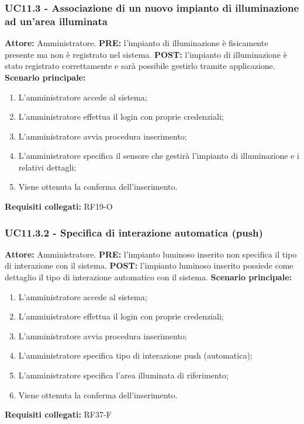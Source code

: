 \documentclass[a4paper, 12pt]{article}
\begin{document}
\subsubsection{UC11.3 - Associazione di un nuovo impianto di illuminazione ad un'area illuminata}
\textbf{Attore:} Amministratore.\newline
\textbf{PRE:} l'impianto di illuminazione è fisicamente presente ma non è registrato nel sistema.\newline
\textbf{POST:} l'impianto di illuminazione è stato registrato correttamente e sarà possibile gestirlo tramite applicazione.\newline
\textbf{Scenario principale:}
\begin{enumerate}
    \item L'amministratore accede al sistema;
    \item L'amministratore effettua il login con proprie credenziali;
    \item L'amministratore avvia procedura inserimento;
    \item L'amministratore specifica il sensore che gestirà l'impianto di illuminazione e i relativi dettagli;
    \item Viene ottenuta la conferma dell'inserimento.
\end{enumerate}
\textbf{Requisiti collegati:} RF19-O\newline

\subsubsection{UC11.3.2 - Specifica di interazione automatica (push)}
\textbf{Attore:} Amministratore.\newline
\textbf{PRE:} l'impianto luminoso inserito non specifica il tipo di interazione con il sistema.\newline
\textbf{POST:} l'impianto luminoso inserito possiede come dettaglio il tipo di interazione automatico con il sistema.\newline
\textbf{Scenario principale:}
\begin{enumerate}
    \item L'amministratore accede al sistema;
    \item L'amministratore effettua il login con proprie credenziali;
    \item L'amministratore avvia procedura inserimento;
    \item L'amministratore specifica tipo di interazione push (automatica);
    \item L'amministratore specifica l'area illuminata di riferimento;
    \item Viene ottenuta la conferma dell'inserimento.
\end{enumerate}
\textbf{Requisiti collegati:} RF37-F\newline
\end{document}
